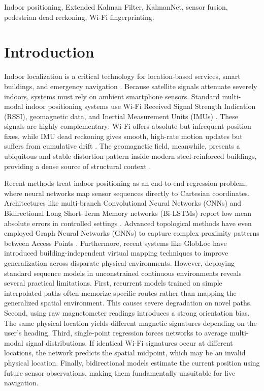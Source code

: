 \documentclass[conference]{IEEEtran}
\begin{document}
\begin{IEEEkeywords}
Indoor positioning, Extended Kalman Filter, KalmanNet, sensor fusion, pedestrian dead reckoning, Wi-Fi fingerprinting.
\end{IEEEkeywords}

\section{Introduction}

Indoor localization is a critical technology for location-based services, smart buildings, and emergency navigation \cite{radar}. Because satellite signals attenuate severely indoors, systems must rely on ambient smartphone sensors. Standard multi-modal indoor positioning systems use Wi-Fi Received Signal Strength Indication (RSSI), geomagnetic data, and Inertial Measurement Units (IMUs) \cite{horus, hybridwifi}. These signals are highly complementary: Wi-Fi offers absolute but infrequent position fixes, while IMU dead reckoning gives smooth, high-rate motion updates but suffers from cumulative drift \cite{nnwifipdr}. The geomagnetic field, meanwhile, presents a ubiquitous and stable distortion pattern inside modern steel-reinforced buildings, providing a dense source of structural context \cite{overviewdatasets}.

Recent methods treat indoor positioning as an end-to-end regression problem, where neural networks map sensor sequences directly to Cartesian coordinates. Architectures like multi-branch Convolutional Neural Networks (CNNs) and Bidirectional Long Short-Term Memory networks (Bi-LSTMs) report low mean absolute errors in controlled settings \cite{deeppos,minloc, bilstmmag}. Advanced topological methods have even employed Graph Neural Networks (GNNs) to capture complex proximity patterns between Access Points \cite{wang2024gnn}. Furthermore, recent systems like GlobLoc \cite{rizk2023globloc} have introduced building-independent virtual mapping techniques to improve generalization across disparate physical environments. However, deploying standard sequence models in unconstrained continuous environments reveals several practical limitations. First, recurrent models trained on simple interpolated paths often memorize specific routes rather than mapping the generalized spatial environment. This causes severe degradation on novel paths. Second, using raw magnetometer readings introduces a strong orientation bias. The same physical location yields different magnetic signatures depending on the user's heading. Third, single-point regression forces networks to average multi-modal signal distributions. If identical Wi-Fi signatures occur at different locations, the network predicts the spatial midpoint, which may be an invalid physical location. Finally, bidirectional models estimate the current position using future sensor observations, making them fundamentally unsuitable for live navigation.
\end{document}
